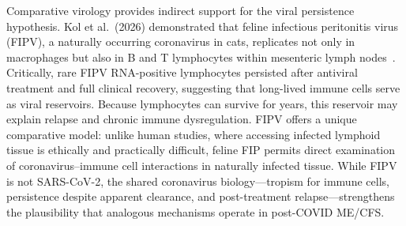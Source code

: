 Comparative virology provides indirect support for the viral persistence hypothesis. Kol et al.\ (2026) demonstrated that feline infectious peritonitis virus (FIPV), a naturally occurring coronavirus in cats, replicates not only in macrophages but also in B and T lymphocytes within mesenteric lymph nodes~\cite{Kol2026fipv}. Critically, rare FIPV RNA-positive lymphocytes persisted after antiviral treatment and full clinical recovery, suggesting that long-lived immune cells serve as viral reservoirs. Because lymphocytes can survive for years, this reservoir may explain relapse and chronic immune dysregulation. FIPV offers a unique comparative model: unlike human studies, where accessing infected lymphoid tissue is ethically and practically difficult, feline FIP permits direct examination of coronavirus--immune cell interactions in naturally infected tissue. While FIPV is not SARS-CoV-2, the shared coronavirus biology---tropism for immune cells, persistence despite apparent clearance, and post-treatment relapse---strengthens the plausibility that analogous mechanisms operate in post-COVID ME/CFS.

